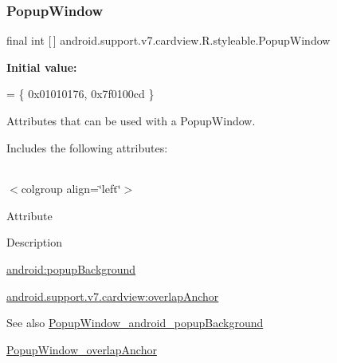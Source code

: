 \subsubsection{\texorpdfstring{Popup\+Window}{PopupWindow}}
{\footnotesize\ttfamily final int \mbox{[}$\,$\mbox{]} android.\+support.\+v7.\+cardview.\+R.\+styleable.\+Popup\+Window\hspace{0.3cm}{\ttfamily [static]}}

{\bfseries Initial value\+:}
\begin{DoxyCode}
= \{
            0x01010176, 0x7f0100cd
        \}
\end{DoxyCode}
Attributes that can be used with a Popup\+Window. 

Includes the following attributes\+:

\tabulinesep=1mm
\begin{longtabu} spread 0pt [c]{*{0}{|X[-1]}|}
\hline
\end{longtabu}
$<$colgroup align=\char`\"{}left\char`\"{}$>$ 

Attribute

Description 

{\ttfamily \hyperlink{classandroid_1_1support_1_1v7_1_1cardview_1_1R_1_1styleable_aba6f546f65061d167e089ae5ced7bc8c}{android\+:popup\+Background}}

{\ttfamily \hyperlink{classandroid_1_1support_1_1v7_1_1cardview_1_1R_1_1styleable_a763d335d6dc14add084daf0179491e94}{android.\+support.\+v7.\+cardview\+:overlap\+Anchor}}

\begin{DoxySeeAlso}{See also}
\hyperlink{classandroid_1_1support_1_1v7_1_1cardview_1_1R_1_1styleable_aba6f546f65061d167e089ae5ced7bc8c}{Popup\+Window\+\_\+android\+\_\+popup\+Background} 

\hyperlink{classandroid_1_1support_1_1v7_1_1cardview_1_1R_1_1styleable_a763d335d6dc14add084daf0179491e94}{Popup\+Window\+\_\+overlap\+Anchor} 
\end{DoxySeeAlso}
\mbox{\label{classandroid_1_1support_1_1v7_1_1cardview_1_1R_1_1styleable_aba6f546f65061d167e089ae5ced7bc8c}} 
